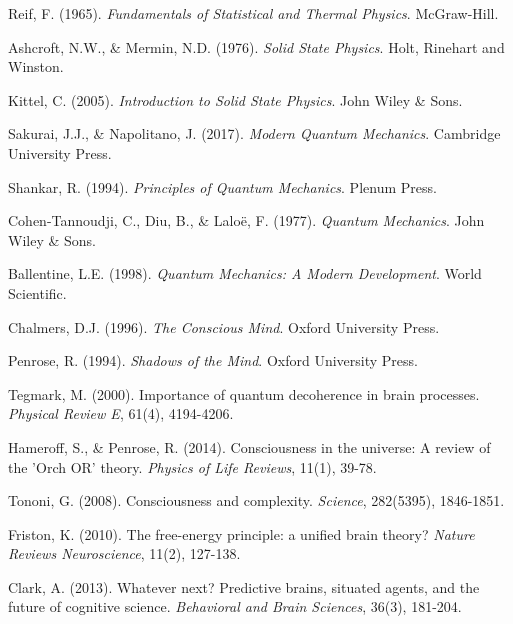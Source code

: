 \documentclass[12pt,a4paper]{article}
\begin{document}
\begin{thebibliography}{99}
Reif, F. (1965). \textit{Fundamentals of Statistical and Thermal Physics}. McGraw-Hill.

Ashcroft, N.W., \& Mermin, N.D. (1976). \textit{Solid State Physics}. Holt, Rinehart and Winston.

Kittel, C. (2005). \textit{Introduction to Solid State Physics}. John Wiley \& Sons.

Sakurai, J.J., \& Napolitano, J. (2017). \textit{Modern Quantum Mechanics}. Cambridge University Press.

Shankar, R. (1994). \textit{Principles of Quantum Mechanics}. Plenum Press.

Cohen-Tannoudji, C., Diu, B., \& Laloë, F. (1977). \textit{Quantum Mechanics}. John Wiley \& Sons.

Ballentine, L.E. (1998). \textit{Quantum Mechanics: A Modern Development}. World Scientific.

Chalmers, D.J. (1996). \textit{The Conscious Mind}. Oxford University Press.

Penrose, R. (1994). \textit{Shadows of the Mind}. Oxford University Press.

Tegmark, M. (2000). Importance of quantum decoherence in brain processes. \textit{Physical Review E}, 61(4), 4194-4206.

Hameroff, S., \& Penrose, R. (2014). Consciousness in the universe: A review of the 'Orch OR' theory. \textit{Physics of Life Reviews}, 11(1), 39-78.

Tononi, G. (2008). Consciousness and complexity. \textit{Science}, 282(5395), 1846-1851.

Friston, K. (2010). The free-energy principle: a unified brain theory? \textit{Nature Reviews Neuroscience}, 11(2), 127-138.

Clark, A. (2013). Whatever next? Predictive brains, situated agents, and the future of cognitive science. \textit{Behavioral and Brain Sciences}, 36(3), 181-204.

\end{thebibliography}
\end{document}
